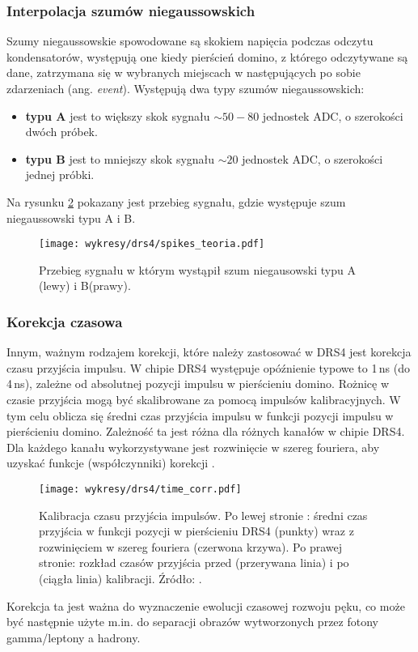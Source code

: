 \documentclass[a4paper,11pt,twoside]{article}
\begin{document}
\subsubsection{Interpolacja szumów niegaussowskich}
Szumy niegaussowskie spowodowane  są skokiem napięcia podczas odczytu kondensatorów, występują one kiedy pierścień domino, z którego odczytywane są dane, zatrzymana się w wybranych miejscach w następujących po sobie zdarzeniach (ang. \textsl{event}). Występują dwa typy szumów niegaussowskich:
\begin{itemize}
\item {\bf{typu A}} jest to większy skok sygnału $\sim 50 - 80$ jednostek ADC, o szerokości dwóch próbek.
\item {\bf{typu B}} jest to mniejszy skok sygnału $\sim 20$ jednostek ADC, o szerokości jednej próbki.
\end{itemize}
Na rysunku \ref{fig:spike_corr} pokazany jest przebieg sygnału, gdzie występuje szum niegaussowski typu A i B. 
\begin{figure}[H] 
\centering
\texttt{[image: wykresy/drs4/spikes\_teoria.pdf]}
\caption{Przebieg sygnału w którym wystąpił szum niegausowski typu A (lewy) i B(prawy).}
\label{fig:spike_corr}
\end{figure}
\subsubsection{Korekcja czasowa}
Innym, ważnym rodzajem korekcji, które należy zastosować w DRS4 jest korekcja czasu przyjścia impulsu. W chipie DRS4 występuje opóźnienie typowe to 1\,ns (do 4\,ns), zależne od absolutnej pozycji impulsu w pierścieniu domino. Rożnicę w czasie przyjścia mogą być skalibrowane za pomocą impulsów kalibracyjnych. W tym celu oblicza się średni czas przyjścia impulsu w funkcji pozycji impulsu w pierścieniu domino. Zależność ta jest różna dla różnych kanałów w chipie DRS4. Dla każdego kanału wykorzystywane jest rozwinięcie w szereg fouriera, aby uzyskać funkcje (współczynniki) korekcji \cite{drs4_magic}. 
\begin{figure}[H] 
\centering
\texttt{[image: wykresy/drs4/time\_corr.pdf]}
\caption{Kalibracja czasu przyjścia impulsów. Po lewej stronie : średni czas przyjścia w funkcji pozycji w pierścieniu DRS4 (punkty) wraz z rozwinięciem w szereg fouriera (czerwona krzywa). Po prawej stronie: rozkład czasów przyjścia przed (przerywana linia) i po (ciągła linia) kalibracji. Źródło: \cite{drs4_magic}. }
\label{fig:spike_corr}
\end{figure}
Korekcja ta jest ważna do wyznaczenie ewolucji czasowej rozwoju pęku, co może być następnie użyte m.in. do separacji obrazów wytworzonych przez fotony gamma/leptony a hadrony. 
\end{document}

